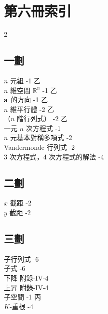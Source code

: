 \section*{第六冊\quad 索\qquad 引}\label{sec:b6s-app1}

\begin{multicols}{2}

\subsection*{一\quad 劃}
\noindent
$n$ 元組 -1 乙\\
$n$ 維空間 $\mathbb{R}^n$ -1 乙\\
$\boldsymbol{\mathbf{a}}$ 的方向 -1 乙\\
$n$ 維平行體 -2 乙\\
（$n$ 階行列式） -2 乙\\
一元 $n$ 次方程式 -1\\
$n$ 元基本對稱多項式 -2\\
Vandermonde 行列式 -2\\
3 次方程式，4 次方程式的解法 -4

\subsection*{二\quad 劃}
\noindent
$x$ 截距 -2\\
$y$ 截距 -2

\subsection*{三\quad 劃}
\noindent
子行列式 -6\\
子式 -6\\
下降 \dotfill 附錄-IV-4\\
上昇 \dotfill 附錄-IV-4\\
子空間 -1 丙\\
$K$-重根 -4


\end{multicols}
